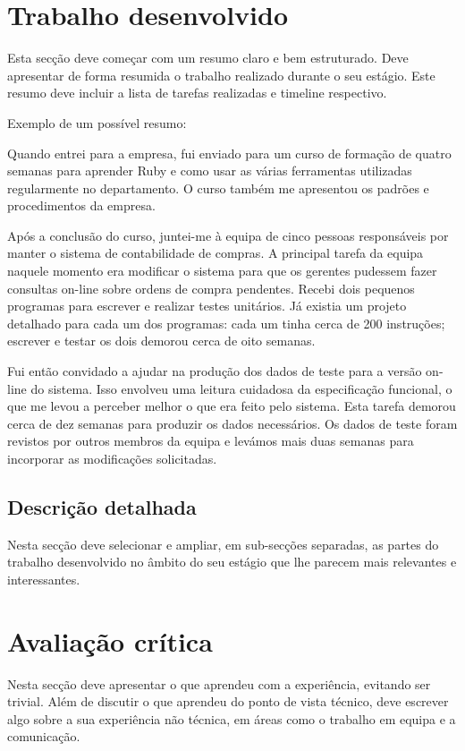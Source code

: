 \documentclass{article}
\begin{document}
\cleardoublepage
\section{Trabalho desenvolvido}
\label{sec:trab-dev}
Esta secção deve começar com um resumo claro e bem estruturado. Deve apresentar de forma resumida o trabalho realizado durante o seu estágio. Este resumo deve incluir a lista de tarefas realizadas e timeline respectivo.

Exemplo de um possível resumo:

Quando entrei para a empresa, fui enviado para um curso de formação de quatro semanas para aprender Ruby e como usar as várias ferramentas utilizadas regularmente no departamento. O curso também me apresentou os padrões e procedimentos da empresa.

Após a conclusão do curso, juntei-me à equipa de cinco pessoas responsáveis por manter o sistema de contabilidade de compras. A principal tarefa da equipa naquele momento era modificar o sistema para que os gerentes pudessem fazer consultas on-line sobre ordens de compra pendentes. Recebi dois pequenos programas para escrever e realizar testes unitários. Já existia um projeto detalhado para cada um dos programas: cada um tinha cerca de 200 instruções; escrever e testar os dois demorou cerca de oito semanas.

Fui então convidado a ajudar na produção dos dados de teste para a versão on-line do sistema. Isso envolveu uma leitura cuidadosa da especificação funcional, o que me levou a perceber melhor o que era feito pelo sistema. Esta tarefa demorou cerca de dez semanas para produzir os dados necessários. Os dados de teste foram revistos por outros membros da equipa e levámos mais duas semanas para incorporar as modificações solicitadas.

\subsection{Descrição detalhada}
Nesta secção deve  selecionar e ampliar, em sub-secções separadas, as partes do trabalho desenvolvido no âmbito do seu estágio que lhe parecem mais relevantes e interessantes.

\cleardoublepage
\section{Avaliação crítica}
\label{sec:ava-crt}
Nesta secção deve apresentar o que aprendeu com a experiência, evitando ser trivial. Além de discutir o que aprendeu do ponto de vista técnico, deve escrever algo sobre a sua experiência não técnica, em áreas como o trabalho em equipa e a comunicação.
\end{document}
